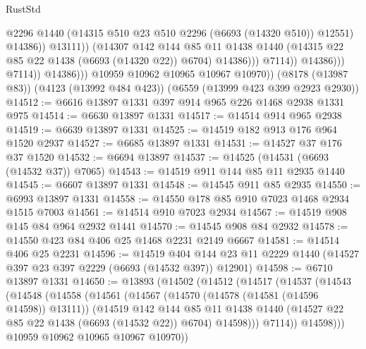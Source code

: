 \begin{lexlean}{RustStd}
\begin{coremodule}
                                        @2296
                                        @1440
                                        (@14315 @510 @23 @510 @2296 (@6693 (@14320 @510)) @12551)
                                        @14386))
                                    @13111))
                                (@14307
                                  @142
                                  @144
                                  @85
                                  @11
                                  @1438
                                  @1440
                                  (@14315 @22 @85 @22 @1438 (@6693 (@14320 @22)) @6704)
                                  @14386)))
                            @7114))
                        @14386)))
                  @7114))
              @14386)))
        @10959
        @10962
        @10965
        @10967
        @10970))
    (@8178 (@13987 @83))
    (@4123 (@13992 @484 @423))
    (@6559 (@13999 @423 @399 @2923 @2930))
@14512 := @6616 @13897 @1331 @397 @914 @965 @226 @1468 @2938 @1331 @975
@14514 := @6630 @13897 @1331
@14517 := @14514 @914 @965 @2938
@14519 := @6639 @13897 @1331
@14525 := @14519 @182 @913 @176 @964 @1520 @2937
@14527 := @6685 @13897 @1331
@14531 := @14527 @37 @176 @37 @1520
@14532 := @6694 @13897
@14537 := @14525 (@14531 (@6693 (@14532 @37)) @7065)
@14543 := @14519 @911 @144 @85 @11 @2935 @1440
@14545 := @6607 @13897 @1331
@14548 := @14545 @911 @85 @2935
@14550 := @6993 @13897 @1331
@14558 := @14550 @178 @85 @910 @7023 @1468 @2934 @1515 @7003
@14561 := @14514 @910 @7023 @2934
@14567 := @14519 @908 @145 @84 @964 @2932 @1441
@14570 := @14545 @908 @84 @2932
@14578 := @14550 @423 @84 @406 @25 @1468 @2231 @2149 @6667
@14581 := @14514 @406 @25 @2231
@14596 := @14519
    @404
    @144
    @23
    @11
    @2229
    @1440
    (@14527 @397 @23 @397 @2229 (@6693 (@14532 @397)) @12901)
@14598 := @6710 @13897 @1331
@14650 := @13893
    (@14502
      (@14512
        (@14517
          (@14537
            (@14543
              (@14548
                (@14558
                  (@14561
                    (@14567
                      (@14570 (@14578 (@14581 (@14596 @14598)) @13111))
                      (@14519
                        @142
                        @144
                        @85
                        @11
                        @1438
                        @1440
                        (@14527 @22 @85 @22 @1438 (@6693 (@14532 @22)) @6704)
                        @14598)))
                  @7114))
              @14598)))
        @10959
        @10962
        @10965
        @10967
        @10970))

\end{coremodule}
\end{lexlean}
